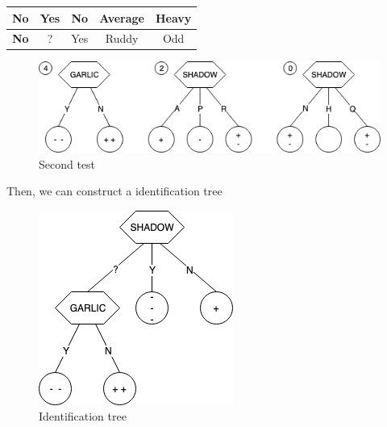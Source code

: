 \documentclass[12pt]{book}
\begin{document}
\begin{table}[ht]
\begin{tabular}{|c|c|c|c|c|}
		\rowcolor[HTML]{000000} 
		{\color[HTML]{000000} \textbf{No}}      & {\color[HTML]{000000} Yes}             & {\color[HTML]{000000} No}              & {\color[HTML]{000000} Average}             & {\color[HTML]{000000} Heavy}           \\ \hline
		{\color[HTML]{000000} \textbf{No}}      & {\color[HTML]{000000} ?}               & {\color[HTML]{000000} Yes}             & {\color[HTML]{000000} Ruddy}               & {\color[HTML]{000000} Odd}             \\ \hline
	\end{tabular}
\end{table}
\begin{figure}[ht]
	\centering
	\includegraphics[scale=0.7]{Figure/Figure11_2.png}
	\caption{Second test}
\end{figure}
\indent Then, we can construct a identification tree
\begin{figure}[ht]
	\centering
	\includegraphics[scale=0.7]{Figure/Figure11_3.png}
	\caption{Identification tree}
\end{figure}
\end{document}
